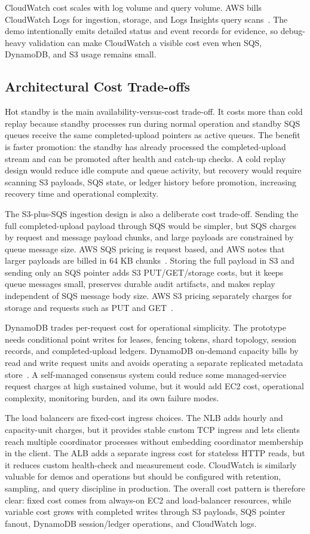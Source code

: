 \documentclass[conference]{IEEEtran}
\begin{document}
CloudWatch cost scales with log volume and query volume. AWS bills CloudWatch Logs for ingestion, storage, and Logs Insights query scans~\cite{awscloudwatch}. The demo intentionally emits detailed status and event records for evidence, so debug-heavy validation can make CloudWatch a visible cost even when SQS, DynamoDB, and S3 usage remains small.

\subsection{Architectural Cost Trade-offs}

Hot standby is the main availability-versus-cost trade-off. It costs more than cold replay because standby processes run during normal operation and standby SQS queues receive the same completed-upload pointers as active queues. The benefit is faster promotion: the standby has already processed the completed-upload stream and can be promoted after health and catch-up checks. A cold replay design would reduce idle compute and queue activity, but recovery would require scanning S3 payloads, SQS state, or ledger history before promotion, increasing recovery time and operational complexity.

The S3-plus-SQS ingestion design is also a deliberate cost trade-off. Sending the full completed-upload payload through SQS would be simpler, but SQS charges by request and message payload chunks, and large payloads are constrained by queue message size. AWS SQS pricing is request based, and AWS notes that larger payloads are billed in 64 KB chunks~\cite{awssqs}. Storing the full payload in S3 and sending only an SQS pointer adds S3 PUT/GET/storage costs, but it keeps queue messages small, preserves durable audit artifacts, and makes replay independent of SQS message body size. AWS S3 pricing separately charges for storage and requests such as PUT and GET~\cite{awss3}.

DynamoDB trades per-request cost for operational simplicity. The prototype needs conditional point writes for leases, fencing tokens, shard topology, session records, and completed-upload ledgers. DynamoDB on-demand capacity bills by read and write request units and avoids operating a separate replicated metadata store~\cite{awsdynamodb}. A self-managed consensus system could reduce some managed-service request charges at high sustained volume, but it would add EC2 cost, operational complexity, monitoring burden, and its own failure modes.

The load balancers are fixed-cost ingress choices. The NLB adds hourly and capacity-unit charges, but it provides stable custom TCP ingress and lets clients reach multiple coordinator processes without embedding coordinator membership in the client. The ALB adds a separate ingress cost for stateless HTTP reads, but it reduces custom health-check and measurement code. CloudWatch is similarly valuable for demos and operations but should be configured with retention, sampling, and query discipline in production. The overall cost pattern is therefore clear: fixed cost comes from always-on EC2 and load-balancer resources, while variable cost grows with completed writes through S3 payloads, SQS pointer fanout, DynamoDB session/ledger operations, and CloudWatch logs.
\end{document}
